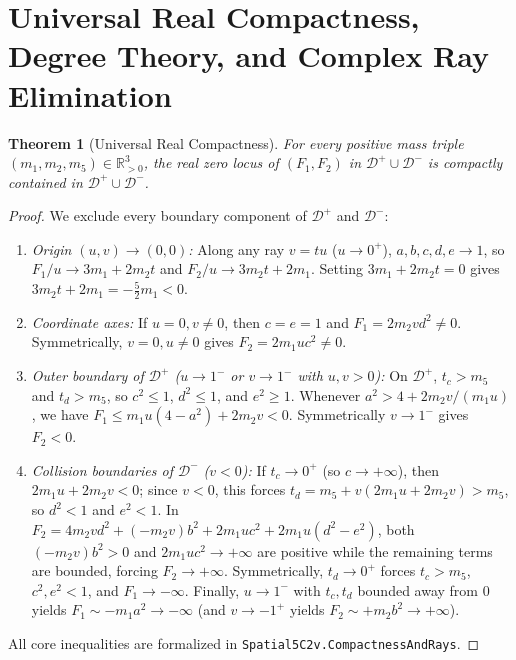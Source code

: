 \documentclass[11pt,a4paper]{amsart}
\newtheorem{theorem}{Theorem}[section]
\theoremstyle{definition}
\theoremstyle{remark}
\newcommand{\R}{\mathbb{R}}
\begin{document}
\section{Universal Real Compactness, Degree Theory, and Complex Ray Elimination}

\begin{theorem}[Universal Real Compactness]\label{thm:compactness}
For \emph{every} positive mass triple $(m_1, m_2, m_5) \in \R_{>0}^3$, the real zero
locus of $(F_1, F_2)$ in $\mathcal{D}^+ \cup \mathcal{D}^-$ is compactly contained in
$\mathcal{D}^+ \cup \mathcal{D}^-$.
\end{theorem}

\begin{proof}
We exclude every boundary component of $\mathcal{D}^+$ and $\mathcal{D}^-$:
\begin{enumerate}[label=(\alph*)]
  \item \emph{Origin $(u,v) \to (0,0)$:} Along any ray $v = tu$ ($u \to 0^+$),
        $a,b,c,d,e \to 1$, so $F_1/u \to 3m_1 + 2m_2 t$ and $F_2/u \to 3m_2 t + 2m_1$.
        Setting $3m_1 + 2m_2 t = 0$ gives $3m_2 t + 2m_1 = -\frac{5}{2} m_1 < 0$.
  \item \emph{Coordinate axes:} If $u = 0, v \neq 0$, then $c = e = 1$ and
        $F_1 = 2 m_2 v d^2 \neq 0$. Symmetrically, $v = 0, u \neq 0$ gives
        $F_2 = 2 m_1 u c^2 \neq 0$.
  \item \emph{Outer boundary of $\mathcal{D}^+$ ($u \to 1^-$ or $v \to 1^-$ with $u,v > 0$):}
        On $\mathcal{D}^+$, $t_c > m_5$ and $t_d > m_5$, so $c^2 \le 1$, $d^2 \le 1$,
        and $e^2 \ge 1$. Whenever $a^2 > 4 + 2 m_2 v / (m_1 u)$, we have
        $F_1 \le m_1 u (4 - a^2) + 2 m_2 v < 0$. Symmetrically $v \to 1^-$ gives $F_2 < 0$.
  \item \emph{Collision boundaries of $\mathcal{D}^-$ ($v < 0$):}
        If $t_c \to 0^+$ (so $c \to +\infty$), then $2m_1 u + 2m_2 v < 0$; since $v < 0$,
        this forces $t_d = m_5 + v(2m_1 u + 2m_2 v) > m_5$, so $d^2 < 1$ and $e^2 < 1$.
        In $F_2 = 4 m_2 v d^2 + (-m_2 v) b^2 + 2 m_1 u c^2 + 2 m_1 u (d^2 - e^2)$, both
        $(-m_2 v) b^2 > 0$ and $2 m_1 u c^2 \to +\infty$ are positive while the remaining
        terms are bounded, forcing $F_2 \to +\infty$.
        Symmetrically, $t_d \to 0^+$ forces $t_c > m_5$, $c^2, e^2 < 1$, and
        $F_1 \to -\infty$.
        Finally, $u \to 1^-$ with $t_c, t_d$ bounded away from $0$ yields
        $F_1 \sim -m_1 a^2 \to -\infty$ (and $v \to -1^+$ yields
        $F_2 \sim +m_2 b^2 \to +\infty$).
\end{enumerate}
All core inequalities are formalized in \texttt{Spatial5C2v.CompactnessAndRays}.
\end{proof}
\end{document}
